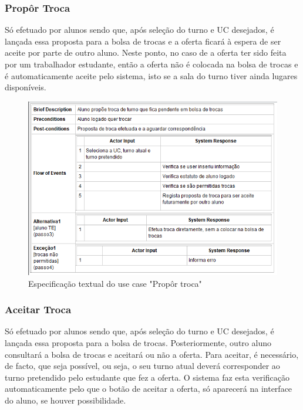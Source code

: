 \documentclass[a4paper]{article}
\begin{document}
\clearpage
\subsubsection{Propôr Troca}
\hspace{3mm}Só efetuado por alunos sendo que, após seleção do turno e UC desejados, é lançada essa proposta para a bolsa de trocas e a oferta ficará à espera de ser aceite por parte de outro aluno. Neste ponto, no caso de a oferta ter sido feita por um trabalhador estudante, então a oferta não é colocada na bolsa de trocas e é automaticamente aceite pelo sistema, isto se a sala do turno tiver ainda lugares disponíveis.

\begin{figure}[H]
\centering
\includegraphics[width=14cm]{UCProporTroca}
\caption{Especificação textual do use case "Propôr troca"}
\label{}
\end{figure}

\clearpage
\subsubsection{Aceitar Troca}
\hspace{3mm}Só efetuado por alunos sendo que, após seleção do turno e UC desejados, é lançada essa proposta para a bolsa de trocas. Posteriormente, outro aluno consultará a bolsa de trocas e aceitará ou não a oferta. Para aceitar, é necessário, de facto, que seja possível, ou seja, o seu turno atual deverá corresponder ao turno pretendido pelo estudante que fez a oferta. O sistema faz esta verificação automaticamente pelo que o botão de aceitar a oferta, só aparecerá na interface do aluno, se houver possibilidade.
\end{document}
